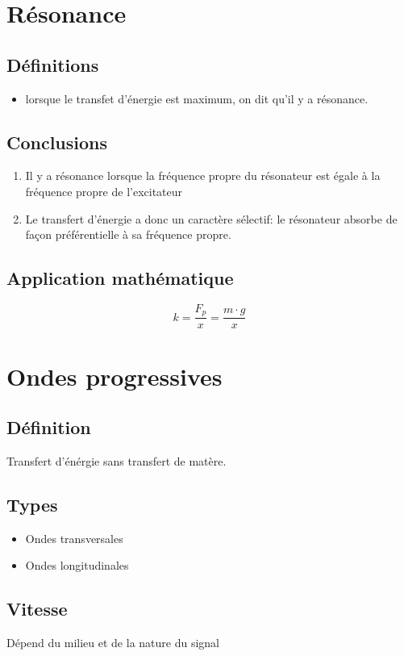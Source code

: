 \documentclass[11pt]{article}
\begin{document}
\section{Résonance}
\subsection{Définitions}
\begin{itemize}
    \item lorsque le transfet d'énergie est maximum, on dit qu'il y a résonance.
\end{itemize}
\subsection{Conclusions}
\begin{enumerate}
    \item Il y a résonance lorsque la fréquence propre du résonateur est égale à la fréquence propre de l'excitateur
    \item Le transfert d'énergie a donc un caractère sélectif: le résonateur absorbe de façon préférentielle à sa fréquence propre.
\end{enumerate}
\subsection{Application mathématique}
\begin{equation}
    k= \dfrac{F_p}{x}=\dfrac{m\cdot g}{x}
\end{equation}

\section{Ondes progressives}
\subsection{Définition}
Transfert d'énérgie sans transfert de matère.
\subsection{Types}
\begin{itemize}
    \item Ondes transversales
    \item Ondes longitudinales
\end{itemize}
\subsection{Vitesse}
Dépend du milieu et de la nature du signal
\end{document}
